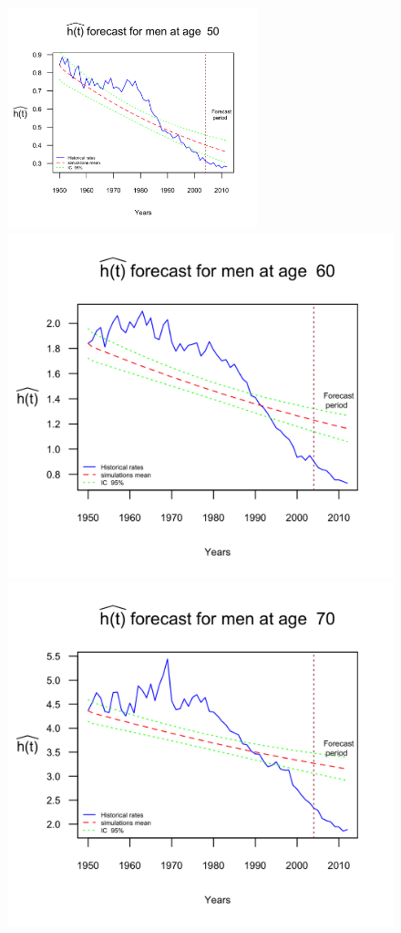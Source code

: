\documentclass[smallextended]{svjour3}
\begin{document}
\begin{figure}[H]
    \includegraphics[width = 2.85in]{PlotMenForecast50.png}
    \includegraphics{PlotMenForecast60.png}
    \includegraphics{PlotMenForecast70.png}

\end{figure}
\end{document}
